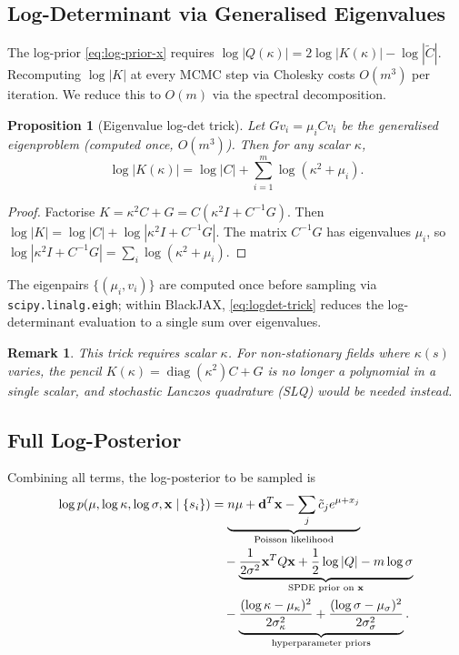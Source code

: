 \documentclass[11pt]{article}
\newtheorem{proposition}{Proposition}
\newtheorem{remark}{Remark}
\DeclareMathOperator{\diag}{diag}
\newcommand{\bx}{\mathbf{x}}
\begin{document}
\subsection{Log-Determinant via Generalised Eigenvalues}
\label{sec:logdet}

The log-prior \eqref{eq:log-prior-x} requires $\log|Q(\kappa)| = 2\log|K(\kappa)| - \log|\tilde{C}|$.
Recomputing $\log|K|$ at every MCMC step via Cholesky costs $O(m^3)$ per
iteration.  We reduce this to $O(m)$ via the spectral decomposition.

\begin{proposition}[Eigenvalue log-det trick]
Let $G v_i = \mu_i C v_i$ be the generalised eigenproblem (computed once,
$O(m^3)$).  Then for any scalar $\kappa$,
\begin{equation}
  \log|K(\kappa)| = \log|C| + \sum_{i=1}^m \log(\kappa^2 + \mu_i).
  \label{eq:logdet-trick}
\end{equation}
\end{proposition}

\begin{proof}
Factorise $K = \kappa^2 C + G = C(\kappa^2 I + C^{-1}G)$.  Then
$\log|K| = \log|C| + \log|\kappa^2 I + C^{-1}G|$.
The matrix $C^{-1}G$ has eigenvalues $\mu_i$, so
$\log|\kappa^2 I + C^{-1}G| = \sum_i \log(\kappa^2 + \mu_i)$.
\end{proof}

The eigenpairs $\{(\mu_i, v_i)\}$ are computed once before sampling via
\texttt{scipy.linalg.eigh}; within BlackJAX, \eqref{eq:logdet-trick} reduces
the log-determinant evaluation to a single sum over eigenvalues.

\begin{remark}
This trick requires scalar $\kappa$.  For non-stationary fields where
$\kappa(s)$ varies, the pencil $K(\kappa) = \diag(\kappa^2)C + G$ is no longer
a polynomial in a single scalar, and stochastic Lanczos quadrature (SLQ) would
be needed instead.
\end{remark}

\subsection{Full Log-Posterior}

Combining all terms, the log-posterior to be sampled is
\begin{align}
  \log p(\mu, \log\kappa, \log\sigma, \bx \mid \{s_i\})
  &= \underbrace{n\mu + \mathbf{d}^T \bx - \sum_j \tilde{c}_j e^{\mu+x_j}}_{\text{Poisson likelihood}} \notag \\
  &\quad - \underbrace{\frac{1}{2\sigma^2}\bx^T Q \bx + \frac{1}{2}\log|Q| - m\log\sigma}_{\text{SPDE prior on } \bx}
  \label{eq:log-posterior} \\
  &\quad - \underbrace{\frac{(\log\kappa - \mu_\kappa)^2}{2\sigma_\kappa^2}
         + \frac{(\log\sigma - \mu_\sigma)^2}{2\sigma_\sigma^2}}_{\text{hyperparameter priors}}. \notag
\end{align}
\end{document}
